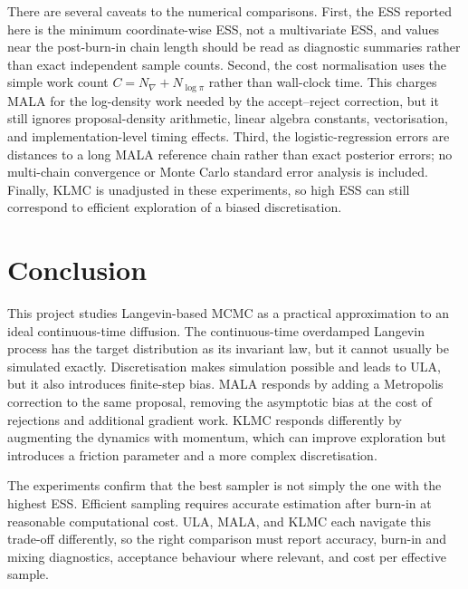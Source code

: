 \documentclass[a4paper,11pt, titlepage]{article}
\theoremstyle{definition}
\theoremstyle{plain}
\theoremstyle{remark}
\begin{document}
There are several caveats to the numerical comparisons. First, the ESS reported here is the minimum coordinate-wise ESS, not a multivariate ESS, and values near the post-burn-in chain length should be read as diagnostic summaries rather than exact independent sample counts. Second, the cost normalisation uses the simple work count $C=N_{\nabla}+N_{\log\pi}$ rather than wall-clock time. This charges MALA for the log-density work needed by the accept--reject correction, but it still ignores proposal-density arithmetic, linear algebra constants, vectorisation, and implementation-level timing effects. Third, the logistic-regression errors are distances to a long MALA reference chain rather than exact posterior errors; no multi-chain convergence or Monte Carlo standard error analysis is included. Finally, KLMC is unadjusted in these experiments, so high ESS can still correspond to efficient exploration of a biased discretisation.

\section{Conclusion}

This project studies Langevin-based MCMC as a practical approximation to
an ideal continuous-time diffusion. The continuous-time overdamped
Langevin process has the target distribution as its invariant law, but it
cannot usually be simulated exactly. Discretisation makes simulation
possible and leads to ULA, but it also introduces finite-step bias. MALA
responds by adding a Metropolis correction to the same proposal, removing
the asymptotic bias at the cost of rejections and additional gradient
work. KLMC responds differently by augmenting the dynamics with momentum,
which can improve exploration but introduces a friction parameter and a
more complex discretisation.

The experiments confirm that the best sampler is not simply the one with
the highest ESS. Efficient sampling requires accurate estimation after
burn-in at reasonable computational cost. ULA, MALA, and KLMC each
navigate this trade-off differently, so the right comparison must report
accuracy, burn-in and mixing diagnostics, acceptance behaviour where
relevant, and cost per effective sample.








\end{document}

